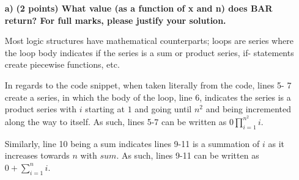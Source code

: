 \documentclass[a4paper,11pt]{article}
\theoremstyle{mytheor}
\begin{document}
\begin{enumerate}
    \item[\textbf{a)}] \textbf{(2 points) What value (as a function of x and n)
    does BAR return? For full marks, please justify your solution.}
    
    Most logic structures have mathematical counterparts; loops are series where
    the loop body indicates if the series is a sum or product series, if-
    statements create piecewise functions, etc.
    
    In regards to the code snippet, when taken literally from the code, lines 5-
    7 create a series, in which the body of the loop, line 6, indicates the 
    series is a product series with $i$ starting at $1$ and going until $n^2$ 
    and being incremented along the way to itself. As such, lines 5-7 can be 
    written as $0 \prod_{i=1}^{n^2} i$.
    
    Similarly, line 10 being a sum indicates lines 9-11 is a summation of $i$ as
    it increases towards $n$ with $sum$. As such, lines 9-11 can be written as
    $0 + \sum_{i=1}^{n} i$.
    

\end{enumerate}
\end{document}
